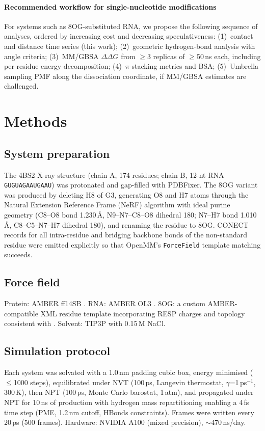 \documentclass[11pt,a4paper]{article}
\begin{document}
\paragraph{Recommended workflow for single-nucleotide modifications}
For systems such as 8OG-substituted RNA, we propose the following sequence
of analyses, ordered by increasing cost and decreasing speculativeness:
(1)~contact and distance time series (this work);
(2)~geometric hydrogen-bond analysis with angle criteria;
(3)~MM/GBSA $\Delta\Delta G$ from $\geq$3 replicas of $\geq$50\,ns each,
including per-residue energy decomposition;
(4)~$\pi$-stacking metrics and BSA;
(5)~Umbrella sampling PMF along the dissociation coordinate, if MM/GBSA
estimates are challenged.

\section{Methods}
\label{sec:methods}

\subsection{System preparation}
The 4BS2 X-ray structure (chain A, 174 residues; chain B,
12-nt RNA \texttt{GUGUAGAAUGAAU}) was protonated and gap-filled with PDBFixer.
The 8OG variant was produced by deleting H8 of G3, generating O8 and H7 atoms
through the Natural Extension Reference Frame (NeRF) algorithm with ideal
purine geometry (C8--O8 bond 1.230\,\si{\angstrom},
N9--N7--C8--O8 dihedral 180\textdegree;
N7--H7 bond 1.010\,\si{\angstrom}, C8--C5--N7--H7 dihedral 180\textdegree),
and renaming the residue to 8OG.
CONECT records for all intra-residue and bridging backbone bonds of the
non-standard residue were emitted explicitly so that OpenMM's
\texttt{ForceField} template matching succeeds.

\subsection{Force field}
Protein: AMBER ff14SB \citep{Maier2015}. RNA: AMBER OL3 \citep{Perez2007}.
8OG: a custom AMBER-compatible XML residue template incorporating
RESP charges and topology consistent with \citet{Aduri2007}.
Solvent: TIP3P with 0.15\,M NaCl.

\subsection{Simulation protocol}
Each system was solvated with a 1.0\,nm padding cubic box, energy minimised
($\leq$1000 steps), equilibrated under NVT (100\,ps, Langevin thermostat,
$\gamma$=1\,ps$^{-1}$, 300\,K), then NPT (100\,ps, Monte Carlo barostat,
1\,atm), and propagated under NPT for 10\,ns of production with hydrogen
mass repartitioning enabling a 4\,fs time step (PME, 1.2\,nm cutoff,
HBonds constraints). Frames were written every 20\,ps (500 frames).
Hardware: NVIDIA A100 (mixed precision), $\sim$470\,ns/day.
\end{document}
